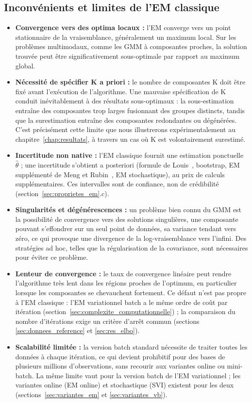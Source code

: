 \subsection{Inconvénients et limites de l'EM classique}\label{sec:inconvenients_et_limites_de_l}
\begin{itemize}
\item \textbf{Convergence vers des optima locaux : }l'EM converge vers un point stationnaire de la vraisemblance, généralement un maximum local. Sur les problèmes multimodaux, comme les GMM à composantes proches, la solution trouvée peut être significativement sous-optimale par rapport au maximum global.
\item \textbf{Nécessité de spécifier K a priori : }le nombre de composantes K doit être fixé avant l'exécution de l'algorithme. Une mauvaise spécification de K conduit inévitablement à des résultats sous-optimaux : la sous-estimation entraîne des composantes trop larges fusionnant des groupes distincts, tandis que la surestimation entraîne des composantes redondantes ou dégénérées. C'est précisément cette limite que nous illustrerons expérimentalement au chapitre~\ref{chap:resultats}, à travers un cas où K est volontairement surestimé.
\item \textbf{Incertitude non native : }l'EM classique fournit une estimation ponctuelle $\hat{\theta}$ ; une incertitude s'obtient a posteriori (formule de Louis~\cite{louis1982}, bootstrap, EM supplémenté de Meng et Rubin~\cite{meng1991}, EM stochastique), au prix de calculs supplémentaires. Ces intervalles sont de confiance, non de crédibilité (section~\ref{sec:proprietes_em}.c).
\item \textbf{Singularités et dégénérescences : }un problème bien connu du GMM est la possibilité de convergence vers des solutions singulières, une composante pouvant s'effondrer sur un seul point de données, sa variance tendant vers zéro, ce qui provoque une divergence de la log-vraisemblance vers l'infini. Des stratégies ad hoc, telles que la régularisation de la covariance, sont nécessaires pour éviter ce problème.
\item \textbf{Lenteur de convergence : }le taux de convergence linéaire peut rendre l'algorithme très lent dans les régions proches de l'optimum, en particulier lorsque les composantes se chevauchent fortement. Ce défaut n'est pas propre à l'EM classique : l'EM variationnel batch a le même ordre de coût par itération (section~\ref{sec:complexite_computationnelle}) ; la comparaison du nombre d'itérations exige un critère d'arrêt commun (sections \ref{sec:donnees_reference} et \ref{sec:res_elbo}).
\item \textbf{Scalabilité limitée : }la version batch standard nécessite de traiter toutes les données à chaque itération, ce qui devient prohibitif pour des bases de plusieurs millions d'observations, sans recourir aux variantes online ou mini-batch. La même limite vaut pour la version batch de l'EM variationnel ; les variantes online (EM online) et stochastique (SVI) existent pour les deux (sections~\ref{sec:variantes_em} et \ref{sec:variantes_vb}).
\end{itemize}
